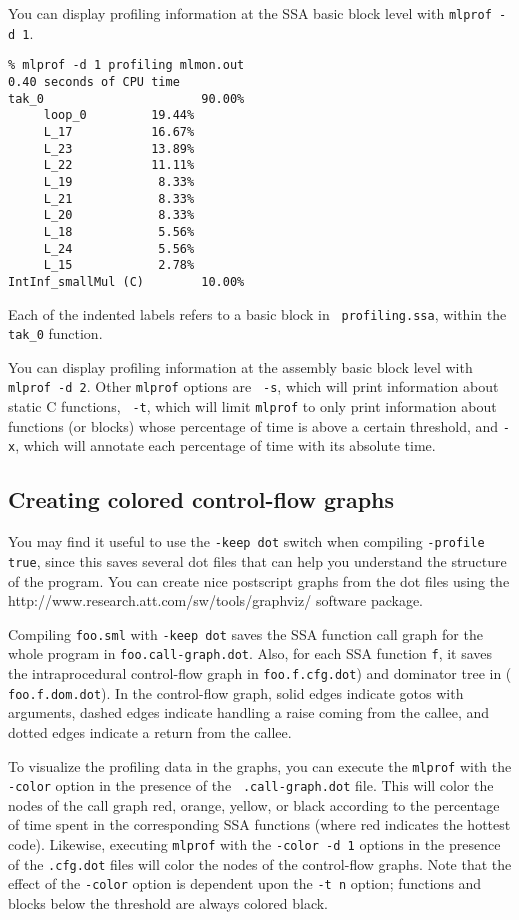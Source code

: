 You can display profiling information at the SSA basic block level
with {\tt mlprof -d 1}.

\begin{verbatim}
% mlprof -d 1 profiling mlmon.out
0.40 seconds of CPU time
tak_0                      90.00%
     loop_0         19.44%       
     L_17           16.67%       
     L_23           13.89%       
     L_22           11.11%       
     L_19            8.33%       
     L_21            8.33%       
     L_20            8.33%       
     L_18            5.56%       
     L_24            5.56%       
     L_15            2.78%       
IntInf_smallMul (C)        10.00%
\end{verbatim}
Each of the indented labels refers to a basic block in {\tt
  profiling.ssa}, within the {\tt tak\_0} function.

You can display profiling information at the assembly basic block
level with {\tt mlprof -d 2}.  Other {\tt mlprof} options are {\tt
  -s}, which will print information about static C functions, {\tt
  -t}, which will limit {\tt mlprof} to only print information about
functions (or blocks) whose percentage of time is above a certain
threshold, and {\tt -x}, which will annotate each percentage of time
with its absolute time.

\subsection{Creating colored control-flow graphs}

You may find it useful to use the {\tt -keep dot} switch when
compiling {\tt -profile true}, since this saves several dot files that
can help you understand the structure of the program.  You can create
nice postscript graphs from the dot files using the
		  {http://www.research.att.com/sw/tools/graphviz/}
software package.

Compiling {\tt foo.sml} with {\tt -keep dot} saves the SSA function
call graph for the whole program in {\tt foo.call-graph.dot}.  Also,
for each SSA function {\tt f}, it saves the intraprocedural
control-flow graph in {\tt foo.f.cfg.dot}) and dominator tree in ({\tt
foo.f.dom.dot}).  In the control-flow graph, solid edges indicate
gotos with arguments, dashed edges indicate handling a raise coming
from the callee, and dotted edges indicate a return from the callee.

To visualize the profiling data in the graphs, you can execute the
{\tt mlprof} with the {\tt -color} option in the presence of the {\tt
.call-graph.dot} file.  This will color the nodes of the call graph
red, orange, yellow, or black according to the percentage of time
spent in the corresponding SSA functions (where red indicates the
hottest code).  Likewise, executing {\tt mlprof} with the {\tt -color
-d 1} options in the presence of the {\tt .cfg.dot} files will color
the nodes of the control-flow graphs.  Note that the effect of the
{\tt -color} option is dependent upon the {\tt -t n} option; functions
and blocks below the threshold are always colored black.

